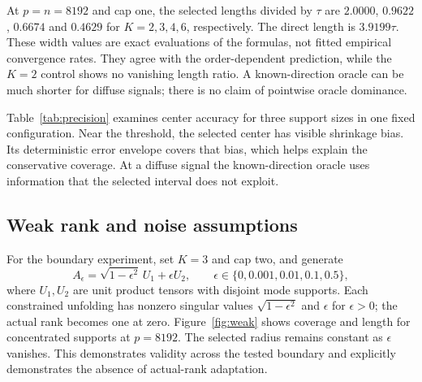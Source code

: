 \documentclass[11pt]{article}
\theoremstyle{remark}
\begin{document}
\begin{table}[ht]
\centering

\caption{Coverage extrema over the stated Gaussian configurations. The oracle is evaluated only for nonzero rank-one signals, giving fewer configurations and a different information set. Each configuration has 2,000 replications; configuration-level uncertainty is retained in the accompanying CSV.}
\label{tab:coverage}
\end{table}

At $p=n=8192$ and cap one, the selected lengths divided by $\tau$ are $2.0000$, $0.9622$, $0.6674$ and $0.4629$ for $K=2,3,4,6$, respectively. The direct length is $3.9199\tau$. These width values are exact evaluations of the formulas, not fitted empirical convergence rates. They agree with the order-dependent prediction, while the $K=2$ control shows no vanishing length ratio. A known-direction oracle can be much shorter for diffuse signals; there is no claim of pointwise oracle dominance.

Table~\ref{tab:precision} examines center accuracy for three support sizes in one fixed configuration. Near the threshold, the selected center has visible shrinkage bias. Its deterministic error envelope covers that bias, which helps explain the conservative coverage. At a diffuse signal the known-direction oracle uses information that the selected interval does not exploit.

\begin{table}[ht]
\centering\small

\caption{Center accuracy and length at $K=3$, $p=n=8192$, $a=M=\sigma=1$ and cap one. Bias, its Monte Carlo standard error in parentheses, RMSE and length are divided by $\tau$. Each row uses 2,000 replications. The support sizes represent concentrated, near-threshold and diffuse signals; the complete grid is retained in the results.}
\label{tab:precision}
\end{table}

\subsection{Weak rank and noise assumptions}
For the boundary experiment, set $K=3$ and cap two, and generate
\[
 A_\epsilon=\sqrt{1-\epsilon^2}\,U_1+\epsilon U_2,
 \qquad \epsilon\in\{0,0.001,0.01,0.1,0.5\},
\]
where $U_1,U_2$ are unit product tensors with disjoint mode supports. Each constrained unfolding has nonzero singular values $\sqrt{1-\epsilon^2}$ and $\epsilon$ for $\epsilon>0$; the actual rank becomes one at zero. Figure~\ref{fig:weak} shows coverage and length for concentrated supports at $p=8192$. The selected radius remains constant as $\epsilon$ vanishes. This demonstrates validity across the tested boundary and explicitly demonstrates the absence of actual-rank adaptation.
\end{document}
